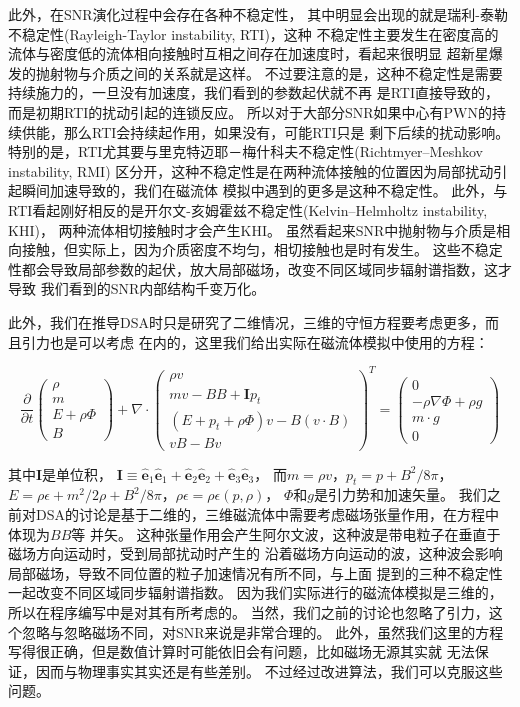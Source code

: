 此外，在SNR演化过程中会存在各种不稳定性，
其中明显会出现的就是瑞利-泰勒不稳定性(Rayleigh-Taylor instability, RTI)，这种
不稳定性主要发生在密度高的流体与密度低的流体相向接触时互相之间存在加速度时，看起来很明显
超新星爆发的抛射物与介质之间的关系就是这样。
不过要注意的是，这种不稳定性是需要持续施力的，一旦没有加速度，我们看到的参数起伏就不再
是RTI直接导致的，而是初期RTI的扰动引起的连锁反应。
所以对于大部分SNR如果中心有PWN的持续供能，那么RTI会持续起作用，如果没有，可能RTI只是
剩下后续的扰动影响。
特别的是，RTI尤其要与里克特迈耶－梅什科夫不稳定性(Richtmyer–Meshkov instability, RMI)
区分开，这种不稳定性是在两种流体接触的位置因为局部扰动引起瞬间加速导致的，我们在磁流体
模拟中遇到的更多是这种不稳定性。
此外，与RTI看起刚好相反的是开尔文-亥姆霍兹不稳定性(Kelvin–Helmholtz instability, KHI)，
两种流体相切接触时才会产生KHI。
虽然看起来SNR中抛射物与介质是相向接触，但实际上，因为介质密度不均匀，相切接触也是时有发生。
这些不稳定性都会导致局部参数的起伏，放大局部磁场，改变不同区域同步辐射谱指数，这才导致
我们看到的SNR内部结构千变万化。

此外，我们在推导DSA时只是研究了二维情况，三维的守恒方程要考虑更多，而且引力也是可以考虑
在内的，这里我们给出实际在磁流体模拟中使用的方程：

\begin{equation}
\frac{\partial}{\partial t} \left( \begin{array}{c}{\rho} \\ {m} \\ {E+\rho \Phi}
\\ {B}\end{array}\right)+\nabla \cdot \left( \begin{array}{c}{\rho v} \\
{m v-B B+\mathbf{I} p_{t}} \\ {\left(E+p_{t}+\rho \Phi\right) v-B(v \cdot B)}
\\ {v B-B v}\end{array}\right)^{T}=\left( \begin{array}{c}{0} \\
{-\rho \nabla \Phi+\rho g} \\ {m \cdot g} \\ {0}\end{array}\right)
\end{equation}

其中$\mathbf{I}$是单位积，
$\mathbf{I} \equiv \hat{\boldsymbol{e}}_{1} \hat{\boldsymbol{e}}_{1}+
\hat{\boldsymbol{e}}_{2} \hat{\boldsymbol{e}}_{2}+\hat{\boldsymbol{e}}_{3}
\hat{\boldsymbol{e}}_{3}$， 而${m}=\rho {v}$，$p_{t}=p+B^{2} / 8\pi$，
$E=\rho \epsilon+m^{2}/2 \rho+B^{2}/8\pi$，$\rho \epsilon=\rho \epsilon(p, \rho)$，
$\Phi$和$g$是引力势和加速矢量。
我们之前对DSA的讨论是基于二维的，三维磁流体中需要考虑磁场张量作用，在方程中体现为$BB$等
并矢。
这种张量作用会产生阿尔文波，这种波是带电粒子在垂直于磁场方向运动时，受到局部扰动时产生的
沿着磁场方向运动的波，这种波会影响局部磁场，导致不同位置的粒子加速情况有所不同，与上面
提到的三种不稳定性一起改变不同区域同步辐射谱指数。
因为我们实际进行的磁流体模拟是三维的，所以在程序编写中是对其有所考虑的。
当然，我们之前的讨论也忽略了引力，这个忽略与忽略磁场不同，对SNR来说是非常合理的。
此外，虽然我们这里的方程写得很正确，但是数值计算时可能依旧会有问题，比如磁场无源其实就
无法保证，因而与物理事实其实还是有些差别。
不过经过改进算法，我们可以克服这些问题。
